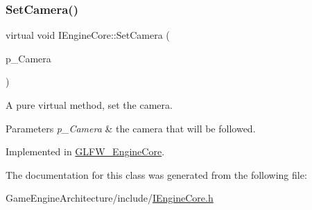 \subsubsection{\texorpdfstring{SetCamera()}{SetCamera()}}
{\footnotesize\ttfamily virtual void I\+Engine\+Core\+::\+Set\+Camera (\begin{DoxyParamCaption}\item[{const std\+::shared\+\_\+ptr$<$ \mbox{\hyperlink{class_camera_component}{Camera\+Component}} $>$}]{p\+\_\+\+Camera }\end{DoxyParamCaption})\hspace{0.3cm}{\ttfamily [pure virtual]}}



A pure virtual method, set the camera. 


\begin{DoxyParams}{Parameters}
{\em p\+\_\+\+Camera} & the camera that will be followed. \\
\hline
\end{DoxyParams}


Implemented in \mbox{\hyperlink{class_g_l_f_w___engine_core_a1c76d22fba6e907d7c1af85412daeedc}{G\+L\+F\+W\+\_\+\+Engine\+Core}}.



The documentation for this class was generated from the following file\+:\begin{DoxyCompactItemize}
\item 
Game\+Engine\+Architecture/include/\mbox{\hyperlink{_i_engine_core_8h}{I\+Engine\+Core.\+h}}\end{DoxyCompactItemize}
